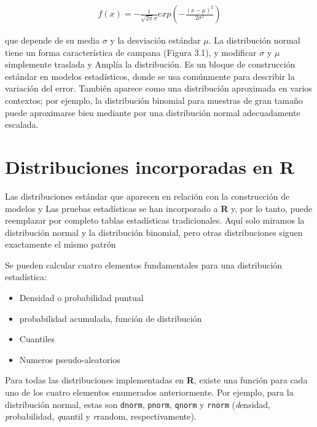 \begingroup
\Large
\begin{gather*}
    f(x) = -\frac{1}{\sqrt{2\pi}\sigma}exp\left(-\frac{(x-\mu )^2}{2\sigma^2}\right)
\end{gather*}
\endgroup

que depende de su media $\sigma$ y la desviación estándar $\mu$. La distribución
normal tiene un forma característica de campana (Figura 3.1), y modificar
$\sigma$ y $\mu$ simplemente traslada y Amplía la distribución. Es un bloque de
construcción estándar en modelos estadísticos, donde se usa comúnmente para
describir la variación del error. También aparece como una distribución
aproximada en varios contextos; por ejemplo, la distribución binomial para
muestras de gran tamaño puede aproximarse bien mediante por una distribución
normal adecuadamente escalada.

\section{Distribuciones incorporadas en \textbf{R}}

Las distribuciones estándar que aparecen en relación con la construcción de
modelos y Las pruebas estadísticas se han incorporado a \textbf{R} y, por lo
tanto, puede reemplazar por completo tablas estadísticas tradicionales. Aquí
solo miramos la distribución normal y la distribución binomial, pero otras
distribuciones siguen exactamente el mismo patrón

Se pueden calcular cuatro elementos fundamentales para una distribución
estadística:


\begin{itemize}

    \item
    Densidad o probabilidad puntual

    \item
    probabilidad acumulada, función de distribución

    \item
    Cuantiles

    \item
    Numeros pseudo-aleatorios


\end{itemize}

Para todas las distribuciones implementadas en \textbf{R}, existe una función
para cada uno de los cuatro elementos enumerados anteriormente. Por ejemplo,
para la distribución normal, estas son \texttt{dnorm}, \texttt{pnorm},
\texttt{qnorm} y \texttt{rnorm} (\textit{d}ensidad, \textit{p}robabilidad,
\textit{q}uantil y \textit{r}random, respectivamente).

